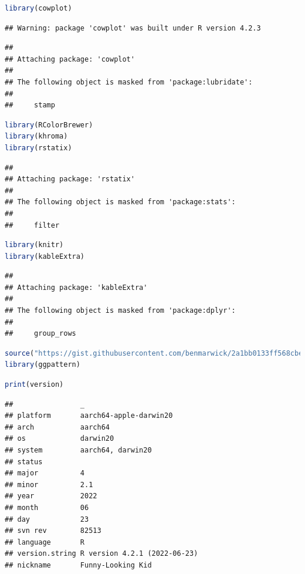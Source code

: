 \documentclass[
]{book}
\begin{document}
\begin{lstlisting}[language=R]
library(cowplot)
\end{lstlisting}

\begin{lstlisting}
## Warning: package 'cowplot' was built under R version 4.2.3
\end{lstlisting}

\begin{lstlisting}
## 
## Attaching package: 'cowplot'
## 
## The following object is masked from 'package:lubridate':
## 
##     stamp
\end{lstlisting}

\begin{lstlisting}[language=R]
library(RColorBrewer)
library(khroma)
library(rstatix)
\end{lstlisting}

\begin{lstlisting}
## 
## Attaching package: 'rstatix'
## 
## The following object is masked from 'package:stats':
## 
##     filter
\end{lstlisting}

\begin{lstlisting}[language=R]
library(knitr)
library(kableExtra)
\end{lstlisting}

\begin{lstlisting}
## 
## Attaching package: 'kableExtra'
## 
## The following object is masked from 'package:dplyr':
## 
##     group_rows
\end{lstlisting}

\begin{lstlisting}[language=R]
source("https://gist.githubusercontent.com/benmarwick/2a1bb0133ff568cbe28d/raw/fb53bd97121f7f9ce947837ef1a4c65a73bffb3f/geom_flat_violin.R")
library(ggpattern)
\end{lstlisting}

\begin{lstlisting}[language=R]
print(version)
\end{lstlisting}

\begin{lstlisting}
##                _                           
## platform       aarch64-apple-darwin20      
## arch           aarch64                     
## os             darwin20                    
## system         aarch64, darwin20           
## status                                     
## major          4                           
## minor          2.1                         
## year           2022                        
## month          06                          
## day            23                          
## svn rev        82513                       
## language       R                           
## version.string R version 4.2.1 (2022-06-23)
## nickname       Funny-Looking Kid
\end{lstlisting}
\end{document}
